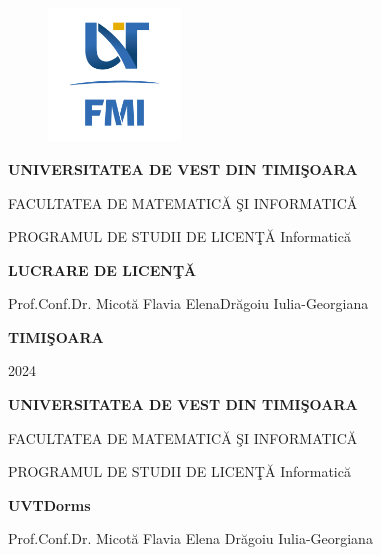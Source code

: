 \documentclass[12pt,a4paper]{report}
\theoremstyle{definition}
\theoremstyle{remark}
\begin{document}
\thispagestyle{empty}
\begin{center}
    \begin{figure}[H]
        \vspace{-20pt}
        \begin{center}
            \includegraphics[width=100pt]{resurse/FMI-03.png}
        \end{center}
    \end{figure}


    {\large{\bf UNIVERSITATEA DE VEST DIN TIMI\c SOARA

        FACULTATEA DE MATEMATIC\u A \c SI INFORMATIC\u A

        PROGRAMUL DE STUDII DE LICEN\c T\u A Informatic\u a  }}

    \vspace{120pt}
    {\huge {\bf LUCRARE DE LICEN\c T\u A}}

    \vspace{150pt}
\end{center}

{\large{}

\noindent Prof.Conf.Dr. Micot\u a Flavia Elena\hfill Dr\u agoiu  Iulia-Georgiana}

\vfill
\begin{center}
    {\bf TIMI\c SOARA

        2024}
\end{center}
\newpage
\thispagestyle{empty}
\begin{center}
    {\large{\bf UNIVERSITATEA DE VEST DIN TIMI\c SOARA

            FACULTATEA DE MATEMATIC\u A \c SI INFORMATIC\u A


            PROGRAMUL DE STUDII DE LICEN\c T\u A  Informatic\u a  }}

    \vspace{120pt}
    {\huge {\bf UVTDorms}}

    \vspace{150pt}
\end{center}

{\large{}

\noindent Prof.Conf.Dr. Micot\u a Flavia Elena \hfill Dr\u agoiu Iulia-Georgiana}
\end{document}
